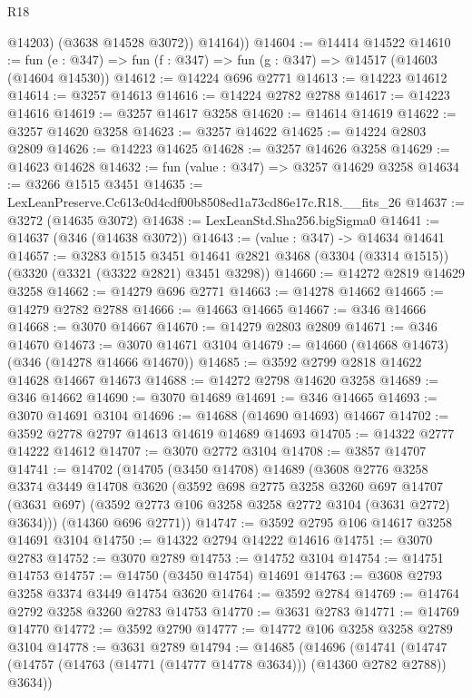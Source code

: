 \begin{lexlean}{R18}
\begin{coremodule}
            @14203)
          (@3638 @14528 @3072))
        @14164))
@14604 := @14414 @14522
@14610 := fun (e : @347) => fun (f : @347) => fun (g : @347) => @14517 (@14603 (@14604 @14530))
@14612 := @14224 @696 @2771
@14613 := @14223 @14612
@14614 := @3257 @14613
@14616 := @14224 @2782 @2788
@14617 := @14223 @14616
@14619 := @3257 @14617 @3258
@14620 := @14614 @14619
@14622 := @3257 @14620 @3258
@14623 := @3257 @14622
@14625 := @14224 @2803 @2809
@14626 := @14223 @14625
@14628 := @3257 @14626 @3258
@14629 := @14623 @14628
@14632 := fun (value : @347) => @3257 @14629 @3258
@14634 := @3266 @1515 @3451
@14635 := LexLeanPreserve.Cc613c0d4cdf00b8508ed1a73cd86e17c.R18.__fits_26
@14637 := @3272 (@14635 @3072)
@14638 := LexLeanStd.Sha256.bigSigma0
@14641 := @14637 (@346 (@14638 @3072))
@14643 := (value : @347) -> @14634 @14641
@14657 := @3283
    @1515
    @3451
    @14641
    @2821
    @3468
    (@3304 (@3314 @1515))
    (@3320 (@3321 (@3322 @2821) @3451 @3298))
@14660 := @14272 @2819 @14629 @3258
@14662 := @14279 @696 @2771
@14663 := @14278 @14662
@14665 := @14279 @2782 @2788
@14666 := @14663 @14665
@14667 := @346 @14666
@14668 := @3070 @14667
@14670 := @14279 @2803 @2809
@14671 := @346 @14670
@14673 := @3070 @14671 @3104
@14679 := @14660 (@14668 @14673) (@346 (@14278 @14666 @14670))
@14685 := @3592 @2799 @2818 @14622 @14628 @14667 @14673
@14688 := @14272 @2798 @14620 @3258
@14689 := @346 @14662
@14690 := @3070 @14689
@14691 := @346 @14665
@14693 := @3070 @14691 @3104
@14696 := @14688 (@14690 @14693) @14667
@14702 := @3592 @2778 @2797 @14613 @14619 @14689 @14693
@14705 := @14322 @2777 @14222 @14612
@14707 := @3070 @2772 @3104
@14708 := @3857 @14707
@14741 := @14702
    (@14705
      (@3450 @14708)
      @14689
      (@3608
        @2776
        @3258
        @3374
        @3449
        @14708
        @3620
        (@3592
          @698
          @2775
          @3258
          @3260
          @697
          @14707
          (@3631 @697)
          (@3592 @2773 @106 @3258 @3258 @2772 @3104 (@3631 @2772) @3634)))
      (@14360 @696 @2771))
@14747 := @3592 @2795 @106 @14617 @3258 @14691 @3104
@14750 := @14322 @2794 @14222 @14616
@14751 := @3070 @2783
@14752 := @3070 @2789
@14753 := @14752 @3104
@14754 := @14751 @14753
@14757 := @14750 (@3450 @14754) @14691
@14763 := @3608 @2793 @3258 @3374 @3449 @14754 @3620
@14764 := @3592 @2784
@14769 := @14764 @2792 @3258 @3260 @2783 @14753
@14770 := @3631 @2783
@14771 := @14769 @14770
@14772 := @3592 @2790
@14777 := @14772 @106 @3258 @3258 @2789 @3104
@14778 := @3631 @2789
@14794 := @14685
    (@14696
      (@14741 (@14747 (@14757 (@14763 (@14771 (@14777 @14778 @3634))) (@14360 @2782 @2788)) @3634))

\end{coremodule}
\end{lexlean}
